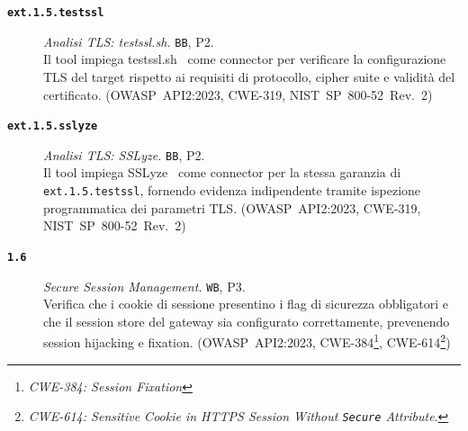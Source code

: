 \begin{description}
      \item[\textbf{\texttt{ext.1.5.testssl}}]
            \textit{Analisi \gls{TLS}: testssl.sh.} \texttt{BB}, P2.\\
            Il tool impiega testssl.sh~\cite{TestsslTestsslsh2026} come connector per verificare la configurazione \gls{TLS} del target rispetto ai requisiti di protocollo, cipher suite e validità del certificato.
            (\gls{OWASP}~API2:2023, \gls{CWE}-319, \gls{NIST}~SP~800-52~Rev.~2)

      \item[\textbf{\texttt{ext.1.5.sslyze}}]
            \textit{Analisi \gls{TLS}: SSLyze.} \texttt{BB}, P2.\\
            Il tool impiega SSLyze~\cite{diquetNablac0d3Sslyze2026} come connector per la stessa garanzia di \texttt{ext.1.5.testssl}, fornendo evidenza indipendente tramite ispezione programmatica dei parametri \gls{TLS}.
            (\gls{OWASP}~API2:2023, \gls{CWE}-319, \gls{NIST}~SP~800-52~Rev.~2)

      \item[\textbf{\texttt{1.6}}]
            \textit{Secure Session Management.} \texttt{WB}, P3.\\
            Verifica che i cookie di sessione presentino i flag di sicurezza obbligatori e che il session store del gateway sia configurato correttamente, prevenendo session hijacking e fixation.
            (\gls{OWASP}~API2:2023, \gls{CWE}-384\footnote{\textit{CWE-384: Session Fixation}}, \gls{CWE}-614\footnote{\textit{CWE-614: Sensitive Cookie in HTTPS Session Without \texttt{Secure} Attribute}.})
\end{description}

